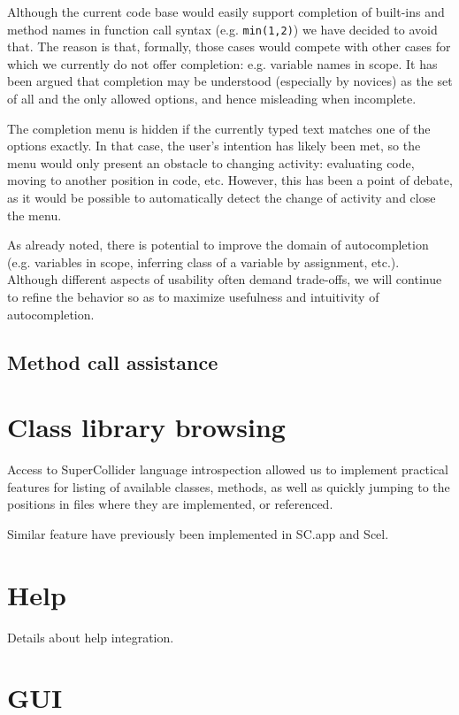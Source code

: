 \documentclass[11pt,a4paper]{article}
\begin{document}
Although the current code base would easily support completion of built-ins and method names in
function call syntax (e.g. \verb|min(1,2)|) we have decided to avoid that. The reason is that,
formally, those cases would compete with other cases for which we currently do not offer completion:
e.g. variable names in scope. It has been argued that completion may be understood (especially by
novices) as the set of all and the only allowed options, and hence misleading when incomplete.

The completion menu is hidden if the currently typed text matches one of the options exactly. In
that case, the user's intention has likely been met, so the menu would only present an obstacle to
changing activity: evaluating code, moving to another position in code, etc. However, this has been
a point of debate, as it would be possible to automatically detect the change of activity and close
the menu.

As already noted, there is potential to improve the domain of autocompletion (e.g. variables in
scope, inferring class of a variable by assignment, etc.). Although different aspects of usability
often demand trade-offs, we will continue to refine the behavior so as to maximize usefulness and
intuitivity of autocompletion.

\subsection{Method call assistance}

\section{Class library browsing}

Access to SuperCollider language introspection allowed us to implement practical features for
listing of available classes, methods, as well as quickly jumping to the positions in files
where they are implemented, or referenced.

Similar feature have previously been implemented in SC.app and Scel.

\section{Help}

Details about help integration.

\section{GUI}
\end{document}
